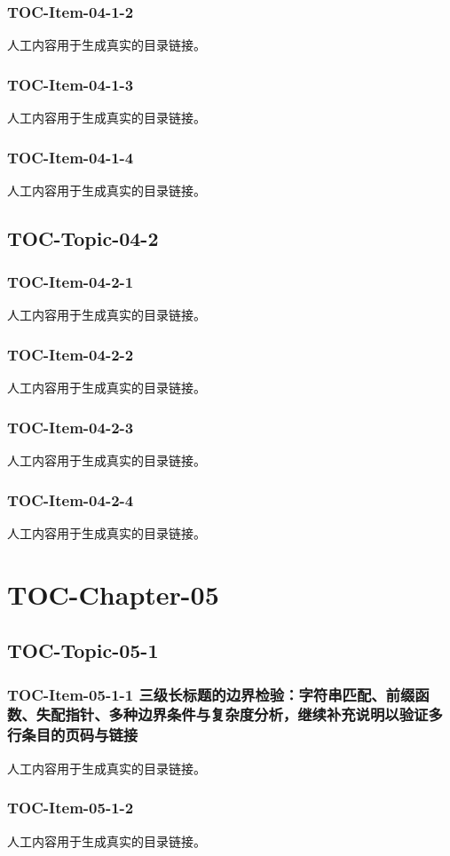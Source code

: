 \subsubsection{TOC-Item-04-1-2}
人工内容用于生成真实的目录链接。
\subsubsection{TOC-Item-04-1-3}
人工内容用于生成真实的目录链接。
\subsubsection{TOC-Item-04-1-4}
人工内容用于生成真实的目录链接。
\subsection{TOC-Topic-04-2}
\subsubsection{TOC-Item-04-2-1}
人工内容用于生成真实的目录链接。
\subsubsection{TOC-Item-04-2-2}
人工内容用于生成真实的目录链接。
\subsubsection{TOC-Item-04-2-3}
人工内容用于生成真实的目录链接。
\subsubsection{TOC-Item-04-2-4}
人工内容用于生成真实的目录链接。
\section{TOC-Chapter-05}
\subsection{TOC-Topic-05-1}
\subsubsection{TOC-Item-05-1-1 三级长标题的边界检验：字符串匹配、前缀函数、失配指针、多种边界条件与复杂度分析，继续补充说明以验证多行条目的页码与链接}
人工内容用于生成真实的目录链接。
\subsubsection{TOC-Item-05-1-2}
人工内容用于生成真实的目录链接。
